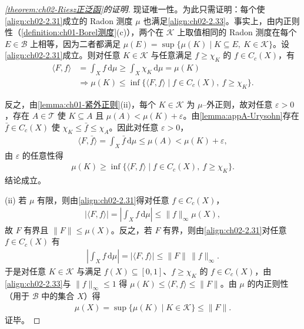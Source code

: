 \documentclass[../../main.tex]{subfiles}%
\begin{document}
\begin{proof}[\cref{theorem:ch02-Riesz正泛函}的证明]
现证唯一性。为此只需证明：每个使\eqref{align:ch02-2.31}成立的 Radon 测度 $\mu$ 也满足\eqref{align:ch02-2.33}。事实上，由内正则性（\cref{definition:ch01-Borel测度}(c)），两个在 $\mathscr K$ 上取值相同的 Radon 测度在每个 $E\in\mathscr B$ 上相等，因为二者都满足 $\mu(E)=\sup\{\mu(K)\mid K\subseteq E,\ K\in\mathscr K\}$。设\eqref{align:ch02-2.31}成立。则对任意 $K\in\mathscr K$ 与任意满足 $f\geqslant\chi_K$ 的 $f\in C_c(X)$，有
\begin{align*}
\langle F,f\rangle&=\int_Xf\,\mathrm{d}\mu\geqslant\int_X\chi_K\,\mathrm{d}\mu=\mu(K)\\
&\Longrightarrow\mu(K)\leqslant\inf\{\langle F,f\rangle\mid f\in C_c(X),\ f\geqslant\chi_K\}.
\end{align*}

反之，由\cref{lemma:ch01-紧外正则}(ii)，每个 $K\in\mathscr K$ 为 $\mu$--外正则，故对任意 $\varepsilon>0$，存在 $A\in\mathscr T$ 使 $K\subseteq A$ 且 $\mu(A)<\mu(K)+\varepsilon$。由\cref{lemma:appA-Urysohn}存在 $\bar f\in C_c(X)$ 使 $\chi_K\leqslant\bar f\leqslant\chi_A$。因此对任意 $\varepsilon>0$，
\begin{align*}
\langle F,\bar f\rangle=\int_X\bar f\,\mathrm{d}\mu\leqslant\mu(A)<\mu(K)+\varepsilon,
\end{align*}
由 $\varepsilon$ 的任意性得
\begin{align*}
\mu(K)\geqslant\inf\{\langle F,f\rangle\mid f\in C_c(X),\ f\geqslant\chi_K\}.
\end{align*}
结论成立。

(ii) 若 $\mu$ 有限，则由\eqref{align:ch02-2.31}得对任意 $f\in C_c(X)$，
\begin{align*}
\left|\langle F,f\rangle\right|=\left|\int_Xf\,\mathrm{d}\mu\right|\leqslant\|f\|_\infty\mu(X),
\end{align*}
故 $F$ 有界且 $\|F\|\leqslant\mu(X)$。反之，若 $F$ 有界，则由\eqref{align:ch02-2.31}对任意 $f\in C_c(X)$ 有
\begin{align*}
\left|\int_Xf\,\mathrm{d}\mu\right|=\left|\langle F,f\rangle\right|\leqslant\|F\|\,\|f\|_\infty.
\end{align*}
于是对任意 $K\in\mathscr K$ 与满足 $f(X)\subseteq[0,1]$、$f\geqslant\chi_K$ 的 $f\in C_c(X)$，由\eqref{align:ch02-2.33}与 $\|f\|_\infty\leqslant1$ 得 $\mu(K)\leqslant\langle F,f\rangle\leqslant\|F\|$。由 $\mu$ 的内正则性（用于 $\mathscr B$ 中的集合 $X$）得
\begin{align*}
\mu(X)=\sup\{\mu(K)\mid K\in\mathscr K\}\leqslant\|F\|.
\end{align*}
证毕。
\end{proof}
\end{document}
